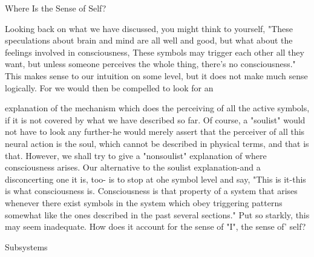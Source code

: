                                Where Is the Sense of Self?

Looking back on what we have discussed, you might think to yourself, "These
speculations about brain and mind are all well and good, but what about the feelings
involved in consciousness, These symbols may trigger each other all they want, but
unless someone perceives the whole thing, there's no consciousness."
        This makes sense to our intuition on some level, but it does not make much sense
logically. For we would then be compelled to look for an





explanation of the mechanism which does the perceiving of all the active symbols, if it is
not covered by what we have described so far. Of course, a "soulist" would not have to
look any further-he would merely assert that the perceiver of all this neural action is the
soul, which cannot be described in physical terms, and that is that. However, we shall try
to give a "nonsoulist" explanation of where consciousness arises.
         Our alternative to the soulist explanation-and a disconcerting one it is, too- is to
stop at ohe symbol level and say, "This is it-this is what consciousness is. Consciousness
is that property of a system that arises whenever there exist symbols in the system which
obey triggering patterns somewhat like the ones described in the past several sections."
Put so starkly, this may seem inadequate. How does it account for the sense of "I", the
sense of' self?

                                        Subsystems

